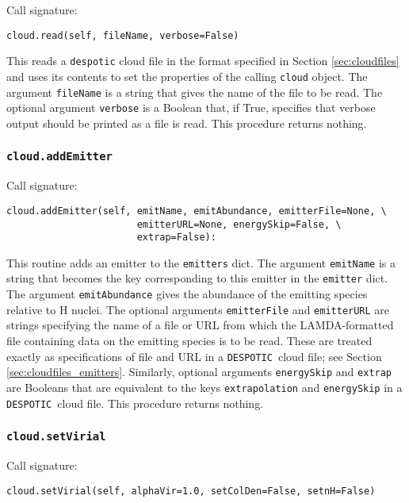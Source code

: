 \documentclass[12pt]{article}
\newcommand{\despotic}{\texttt{DESPOTIC}}
\begin{document}
Call signature:

\begin{verbatim}
cloud.read(self, fileName, verbose=False)
\end{verbatim}

This reads a \texttt{despotic} cloud file in the format specified in Section \ref{sec:cloudfiles} and uses its contents to set the properties of the calling \texttt{cloud} object. The argument \verb=fileName= is a string that gives the name of the file to be read. The optional argument \texttt{verbose} is a Boolean that, if True, specifies that verbose output should be printed as a file is read. This procedure returns nothing.

\subsubsection{\texttt{cloud.addEmitter}}
\label{sec:cloud.addEmitter}

Call signature:

\begin{verbatim}
cloud.addEmitter(self, emitName, emitAbundance, emitterFile=None, \
                       emitterURL=None, energySkip=False, \
                       extrap=False):
\end{verbatim}

This routine adds an emitter to the \texttt{emitters} dict. The argument \verb=emitName= is a string that becomes the key corresponding to this emitter in the \verb=emitter= dict. The argument \verb=emitAbundance= gives the abundance of the emitting species relative to H nuclei. The optional arguments \verb=emitterFile= and \verb=emitterURL= are strings specifying the name of a file or URL from which the LAMDA-formatted file containing data on the emitting species is to be read. These are treated exactly as specifications of file and URL in a \despotic\ cloud file; see Section \ref{sec:cloudfiles_emitters}. Similarly, optional arguments \verb=energySkip= and \verb=extrap= are Booleans that are equivalent to the keys \verb=extrapolation= and \verb=energySkip= in a \despotic\ cloud file. This procedure returns nothing.


\subsubsection{\texttt{cloud.setVirial}}

Call signature:

\begin{verbatim}
cloud.setVirial(self, alphaVir=1.0, setColDen=False, setnH=False)
\end{verbatim}
\end{document}
